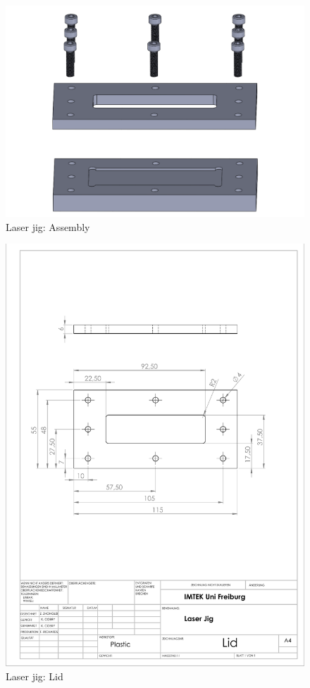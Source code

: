 \begin{figure}[ht]%
\centering
\includegraphics[width=1\textwidth]{figures/appendix/laserjigcropped}%
\caption{Laser jig: Assembly}%
\label{laserjigcropped}%
\end{figure}

\clearpage

\begin{figure}[h]%
\centering
\includegraphics[width=1\textwidth]{figures/appendix/laserjiglid}%
\caption{Laser jig: Lid}%
\label{laserjiglid}%
\end{figure}

